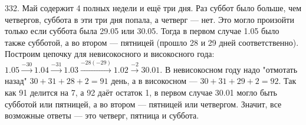 332. Май содержит 4 полных недели и ещё три дня. Раз суббот было больше, чем четвергов, суббота в эти три дня попала, а четверг --- нет. Это могло произойти только если суббота была 29.05 или 30.05. Тогда в первом случае 1.05 было также субботой, а во втором --- пятницей (прошло 28 и 29 дней соответственно). Построим цепочку для невисокосного и високосного года: $1.05\stackrel{-30}{\rightarrow}1.04\stackrel{-31}{\rightarrow}1.03
\stackrel{-28(-29)}{\rightarrow}1.02\stackrel{-2}{\rightarrow}30.01.$
В невисокосном году надо "отмотать назад" $30+31+28+2=91$ день, а в високосном --- $30+31+29+2=92.$ Так как 91 делится на 7, а 92 даёт остаток 1, в первом случае 30.01 могло быть субботой или пятницей, а во втором --- пятницей или четвергом. Значит, все возможные ответы --- это четверг, пятница и суббота.\\
